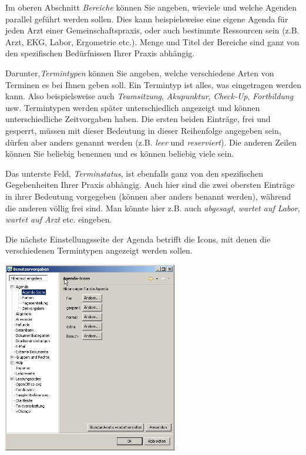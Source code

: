 Im oberen Abschnitt \textit{Bereiche}  können Sie angeben,
wieviele und welche Agenden parallel geführt werden sollen.
Dies kann beispielsweise eine eigene Agenda für jeden Arzt einer
 Gemeinschaftspraxis, oder auch bestimmte Ressourcen sein (z.B. Arzt, EKG, Labor, Ergometrie etc.).
Menge und Titel der Bereiche sind ganz von den spezifischen Bedürfnissen Ihrer Praxis abhängig.

Darunter,\textit{Termintypen}  können Sie angeben, welche
verschiedene Arten von Terminen es bei Ihnen geben soll. Ein Termintyp ist alles, was eingetragen werden kann. Also beispielsweise auch  \textit{Teamsitzung},  \textit{Akupunktur},  \textit{Check-Up},  \textit{Fortbildung}  usw. Termintypen werden später unterschiedlich angezeigt und können unterschiedliche Zeitvorgaben haben. Die ersten beiden Einträge, frei und gesperrt, müssen mit dieser Bedeutung in dieser Reihenfolge angegeben sein, dürfen aber anders genannt werden (z.B. \textit{leer}  und  \textit{reserviert}). Die anderen Zeilen können Sie beliebig benennen und es können beliebig viele sein.

Das unterste Feld, \textit{Terminstatus}, ist ebenfalls ganz von den spezifischen
Gegebenheiten Ihrer Praxis abhängig. Auch hier sind die zwei obersten Einträge in ihrer Bedeutung vorgegeben
(können aber anders benannt werden), während die anderen völlig frei sind. Man könnte hier z.B.
auch  \textit{abgesagt}, \textit{wartet auf Labor}, \textit{wartet auf Arzt}  etc. eingeben.

Die nächste Einstellungsseite der Agenda betrifft die Icons, mit denen die verschiedenen Termintypen angezeigt werden sollen.

\includegraphics[width=3in]{images/settings2}

